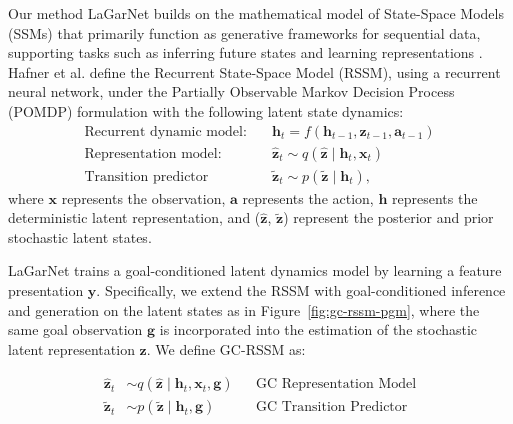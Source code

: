 \documentclass[journal]{IEEEtran}
\begin{document}
Our method LaGarNet builds on the mathematical model of State-Space Models (SSMs) that primarily function as generative frameworks for sequential data, supporting tasks such as inferring future states and learning representations \cite{ma2024interpretable}. Hafner et al. \cite{hafner2019learning} define the Recurrent State-Space Model (RSSM), using a recurrent neural network, under the Partially Observable Markov Decision Process (POMDP) formulation with the following latent state dynamics:
\begin{equation}
\begin{aligned}
    \text{Recurrent dynamic model:} & \quad \bm{h}_t=f(\bm{h}_{t-1},\bm{z}_{t-1},\bm{a}_{t-1}) \\
    \text{Representation model:}    & \quad \hat{\bm{z}}_t\sim q(\hat{\bm{z}}\;|\;\bm{h}_t,\bm{x}_t) \\
    \text{Transition predictor}    & \quad \tilde{\bm{z}}_t\sim p(\tilde{\bm{z}}\;|\;\bm{h}_{t}),
\end{aligned}
\end{equation}
where $\bm{x}$ represents the observation, $\bm{a}$ represents the action, $\bm{h}$ represents the deterministic latent representation, and ($\hat{\bm{z}}$, $\tilde{\bm{z}}$) represent the posterior and prior stochastic latent states. 

LaGarNet trains a goal-conditioned latent dynamics model by learning a feature presentation $\bm{y}$. Specifically, we extend the RSSM with goal-conditioned inference and generation on the latent states as in Figure~\ref{fig:gc-rssm-pgm}, where the same goal observation $\bm{g}$ is incorporated into the estimation of the stochastic latent representation $\bm{z}$. We define GC-RSSM as:

\begin{align}
    \hat{\bm{z}}_t &\sim q(\hat{\bm{z}} \;|\; \bm{h}_t, \bm{x}_t, \bm{g}) 
    && \text{GC Representation Model} \label{eq:gc-repr} \\
    \tilde{\bm{z}}_t &\sim p(\tilde{\bm{z}} \;|\; \bm{h}_t, \bm{g}) 
    && \text{GC Transition Predictor} \label{eq:gc-trans}
\end{align}
\end{document}
